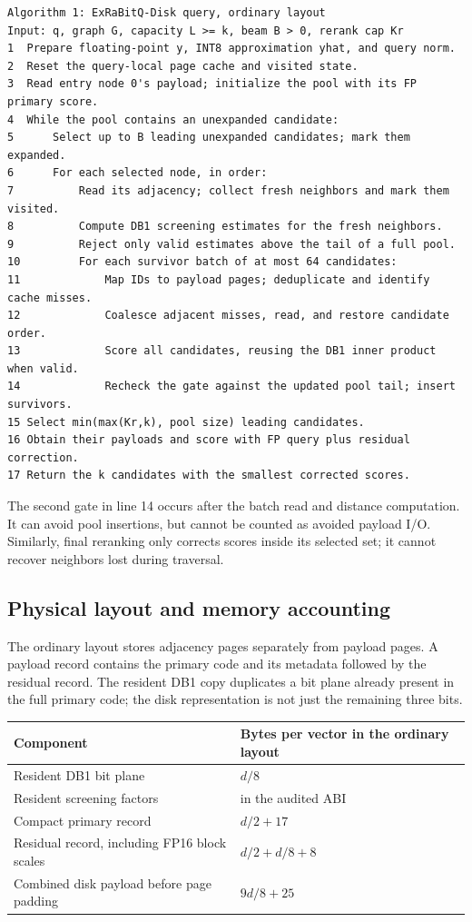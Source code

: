 \begin{lstlisting}
Algorithm 1: ExRaBitQ-Disk query, ordinary layout
Input: q, graph G, capacity L >= k, beam B > 0, rerank cap Kr
1  Prepare floating-point y, INT8 approximation yhat, and query norm.
2  Reset the query-local page cache and visited state.
3  Read entry node 0's payload; initialize the pool with its FP primary score.
4  While the pool contains an unexpanded candidate:
5      Select up to B leading unexpanded candidates; mark them expanded.
6      For each selected node, in order:
7          Read its adjacency; collect fresh neighbors and mark them visited.
8          Compute DB1 screening estimates for the fresh neighbors.
9          Reject only valid estimates above the tail of a full pool.
10         For each survivor batch of at most 64 candidates:
11             Map IDs to payload pages; deduplicate and identify cache misses.
12             Coalesce adjacent misses, read, and restore candidate order.
13             Score all candidates, reusing the DB1 inner product when valid.
14             Recheck the gate against the updated pool tail; insert survivors.
15 Select min(max(Kr,k), pool size) leading candidates.
16 Obtain their payloads and score with FP query plus residual correction.
17 Return the k candidates with the smallest corrected scores.
\end{lstlisting}

The second gate in line 14 occurs after the batch read and distance computation. It can avoid pool insertions, but cannot be counted as avoided payload I/O. Similarly, final reranking only corrects scores inside its selected set; it cannot recover neighbors lost during traversal.

\subsection{Physical layout and memory accounting}

The ordinary layout stores adjacency pages separately from payload pages. A payload record contains the primary code and its metadata followed by the residual record. The resident DB1 copy duplicates a bit plane already present in the full primary code; the disk representation is not just the remaining three bits.

\par\medskip\noindent\begin{tabularx}{\columnwidth}{>{\raggedright\arraybackslash}X >{\raggedright\arraybackslash}X}
\toprule
Component & Bytes per vector in the ordinary layout \\
\midrule
Resident DB1 bit plane & $d/8$ \\
Resident screening factors & 20 in the audited ABI \\
Compact primary record & $d/2+17$ \\
Residual record, including FP16 block scales & $d/2+d/8+8$ \\
Combined disk payload before page padding & $9d/8+25$ \\
\bottomrule
\end{tabularx}
\par\medskip

